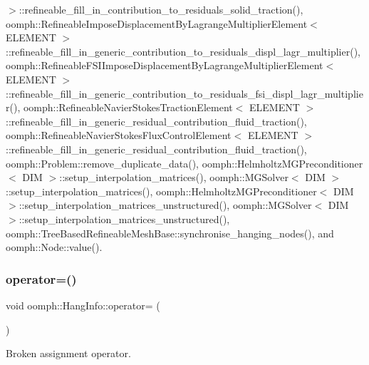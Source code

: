 $>$\+::refineable\+\_\+fill\+\_\+in\+\_\+contribution\+\_\+to\+\_\+residuals\+\_\+solid\+\_\+traction(), oomph\+::\+Refineable\+Impose\+Displacement\+By\+Lagrange\+Multiplier\+Element$<$ E\+L\+E\+M\+E\+N\+T $>$\+::refineable\+\_\+fill\+\_\+in\+\_\+generic\+\_\+contribution\+\_\+to\+\_\+residuals\+\_\+displ\+\_\+lagr\+\_\+multiplier(), oomph\+::\+Refineable\+F\+S\+I\+Impose\+Displacement\+By\+Lagrange\+Multiplier\+Element$<$ E\+L\+E\+M\+E\+N\+T $>$\+::refineable\+\_\+fill\+\_\+in\+\_\+generic\+\_\+contribution\+\_\+to\+\_\+residuals\+\_\+fsi\+\_\+displ\+\_\+lagr\+\_\+multiplier(), oomph\+::\+Refineable\+Navier\+Stokes\+Traction\+Element$<$ E\+L\+E\+M\+E\+N\+T $>$\+::refineable\+\_\+fill\+\_\+in\+\_\+generic\+\_\+residual\+\_\+contribution\+\_\+fluid\+\_\+traction(), oomph\+::\+Refineable\+Navier\+Stokes\+Flux\+Control\+Element$<$ E\+L\+E\+M\+E\+N\+T $>$\+::refineable\+\_\+fill\+\_\+in\+\_\+generic\+\_\+residual\+\_\+contribution\+\_\+fluid\+\_\+traction(), oomph\+::\+Problem\+::remove\+\_\+duplicate\+\_\+data(), oomph\+::\+Helmholtz\+M\+G\+Preconditioner$<$ D\+I\+M $>$\+::setup\+\_\+interpolation\+\_\+matrices(), oomph\+::\+M\+G\+Solver$<$ D\+I\+M $>$\+::setup\+\_\+interpolation\+\_\+matrices(), oomph\+::\+Helmholtz\+M\+G\+Preconditioner$<$ D\+I\+M $>$\+::setup\+\_\+interpolation\+\_\+matrices\+\_\+unstructured(), oomph\+::\+M\+G\+Solver$<$ D\+I\+M $>$\+::setup\+\_\+interpolation\+\_\+matrices\+\_\+unstructured(), oomph\+::\+Tree\+Based\+Refineable\+Mesh\+Base\+::synchronise\+\_\+hanging\+\_\+nodes(), and oomph\+::\+Node\+::value().

\mbox{\label{classoomph_1_1HangInfo_a0b9609ab03f3a1a47a58029e81102466}} 
\subsubsection{\texorpdfstring{operator=()}{operator=()}}
{\footnotesize\ttfamily void oomph\+::\+Hang\+Info\+::operator= (\begin{DoxyParamCaption}\item[{const \hyperlink{classoomph_1_1HangInfo}{Hang\+Info} \&}]{ }\end{DoxyParamCaption})\hspace{0.3cm}{\ttfamily [inline]}}



Broken assignment operator. 



